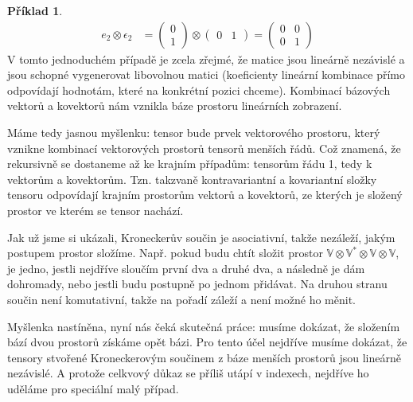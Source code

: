 \documentclass[a5paper,12pt]{amsbook}
\theoremstyle{definition}
\newtheorem{example}{Příklad}[chapter]
\newcommand{\myspace}[1]{\mathbb{#1}}
\newcommand{\mydual}[1]{\myspace{#1^{*}}}
\begin{document}
\begin{example}
\begin{equation*}
\begin{split}
e_2 \otimes \epsilon_2 &= \left(\begin{array}{c}0 \\ 1\end{array}\right) \otimes \left(\begin{array}{cc}0 & 1\end{array}\right) =
\left(\begin{array}{cc}0 & 0 \\ 0 & 1 \end{array}\right)
\end{split}
\end{equation*}
V tomto jednoduchém případě je zcela zřejmé, že matice jsou lineárně nezávislé a jsou schopné vygenerovat libovolnou matici
(koeficienty lineární kombinace přímo odpovídají hodnotám, které na konkrétní pozici chceme). Kombinací bázových vektorů
a kovektorů nám vznikla báze prostoru lineárních zobrazení.

\end{example}

\noindent
Máme tedy jasnou myšlenku: tensor bude prvek vektorového prostoru, který vznikne kombinací vektorových
prostorů tensorů menších řádů. Což znamená, že rekursivně se dostaneme až ke krajním případům: tensorům
řádu 1, tedy k vektorům a kovektorům. Tzn. takzvaně kontravariantní a kovariantní složky tensoru
odpovídají krajním prostorům vektorů a kovektorů, ze kterých je složený prostor ve kterém se tensor
nachází.

Jak už jsme si ukázali, Kroneckerův součin je asociativní, takže nezáleží, jakým postupem prostor
složíme. Např. pokud budu chtít složit prostor $\myspace{V} \otimes \mydual{V} \otimes \myspace{V}
\otimes \myspace{V}$, je jedno, jestli nejdříve sloučím první dva a druhé dva, a následně je dám
dohromady, nebo jestli budu postupně po jednom přidávat. Na druhou stranu součin není komutativní,
takže na pořadí záleží a není možné ho měnit.

Myšlenka nastíněna, nyní nás čeká skutečná práce: musíme dokázat, že složením bází dvou prostorů
získáme opět bázi. Pro tento účel nejdříve musíme dokázat, že tensory stvořené Kroneckerovým
součinem z báze menších prostorů jsou lineárně nezávislé. A protože celkvový důkaz se příliš utápí
v indexech, nejdříve ho uděláme pro speciální malý případ.
\end{document}
